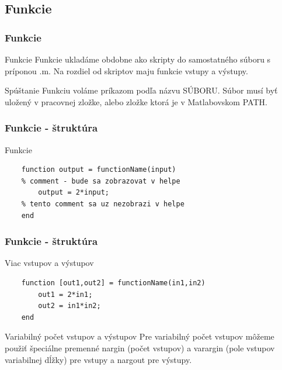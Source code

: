 \documentclass{beamer}
\begin{document}
\subsection{Funkcie}

\begin{frame}
\frametitle{Funkcie}
  \begin{block}{Funkcie}
    Funkcie ukladáme obdobne ako skripty do samostatného súboru s príponou .m. Na rozdiel od skriptov maju funkcie vstupy a výstupy.
  \end{block}
  
  \pause
  
  \begin{block}{Spúštanie}
    Funkciu voláme príkazom podľa názvu SÚBORU. Súbor musí byť uložený v pracovnej zložke, alebo zložke ktorá je v Matlabovskom PATH. 
  \end{block}
  
\end{frame}

\begin{frame}[fragile]
\frametitle{Funkcie - štruktúra}
  \begin{block}{Funkcie}
  \begin{verbatim}
    function output = functionName(input)
    % comment - bude sa zobrazovat v helpe
        output = 2*input;
    % tento comment sa uz nezobrazi v helpe
    end \end{verbatim}
  \end{block}
  
\end{frame}

\begin{frame}[fragile]
\frametitle{Funkcie - štruktúra}
  
  \begin{block}{Viac vstupov a výstupov}
  \begin{verbatim}
    function [out1,out2] = functionName(in1,in2)
        out1 = 2*in1;
        out2 = in1*in2;
    end \end{verbatim}
  \end{block}

  \begin{block}{Variabilný počet vstupov a výstupov}
    Pre variabilný počet vstupov môžeme použiť špeciálne premenné nargin (počet vstupov) a varargin (pole vstupov variabilnej dĺžky) pre vstupy a nargout pre výstupy.
  \end{block}
\end{frame}
\end{document}
